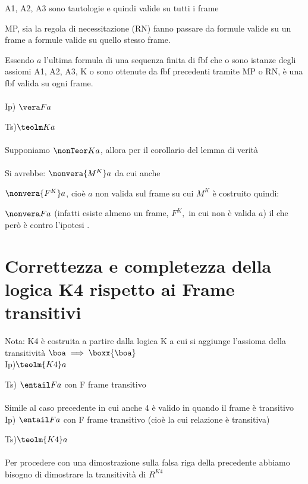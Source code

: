 A1, A2, A3 sono tautologie e quindi valide su tutti i frame

MP, sia la regola di necessitazione (RN) fanno passare da formule
valide su un frame a formule valide su quello stesso frame. 

Essendo $a$ l’ultima formula di una sequenza finita di fbf che o
sono istanze degli assiomi A1, A2, A3, K o sono ottenute da fbf precedenti
tramite MP o RN, è una fbf valida su ogni frame.\\
\\
Ip) $\vera Fa$

Ts)$\teolm Ka$ \\
\\
Supponiamo $\nonTeor Ka$, allora per il corollario del lemma di verità\\


 \\


Si avrebbe: $\nonvera{M^{K}}a$ da cui anche

$\nonvera{F^{K}}a$, cioè $a$ non valida sul frame su cui $M^{K}$
è costruito quindi:

$\nonvera Fa$ (infatti esiste almeno un frame, $F^{K},$ in cui non
è valida $a$) il che però è contro l'ipotesi \lightning.


\section{$ $Correttezza e completezza della logica K4 rispetto ai Frame transitivi}

Nota: K4 è costruita a partire dalla logica K a cui si aggiunge l'assioma
della transitività $\boa\implies\boxx{\boa}$ \\
Ip)$\teolm{K4}a$ 

Ts) $\entail Fa$ con F frame transitivo\\
\\
Simile al caso precedente in cui anche 4 è valido in quando il frame
è transitivo\\


Ip) $\entail Fa$ con F frame transitivo (cioè la cui relazione è
transitiva)

Ts)$\teolm{K4}a$\\
\\
Per procedere con una dimostrazione sulla falsa riga della precedente
abbiamo bisogno di dimostrare la transitività di $R^{K4}$

